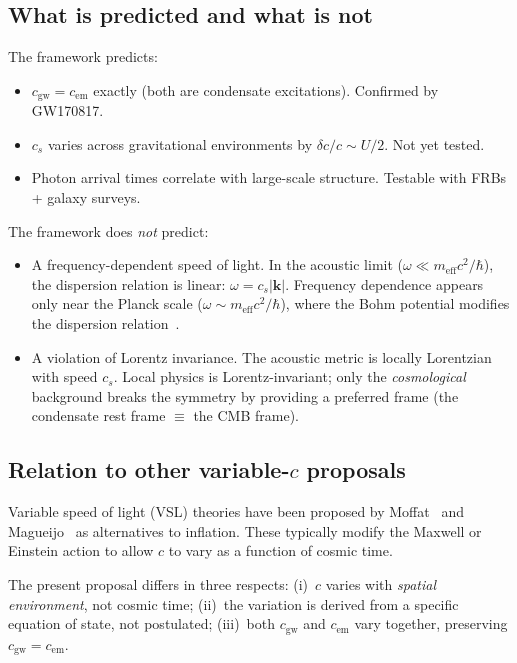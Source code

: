 \documentclass[12pt, a4paper]{article}
\newcommand{\meff}{m_{\mathrm{eff}}}
\begin{document}
\subsection{What is predicted and what is not}

The framework predicts:
\begin{itemize}
\item $c_{\mathrm{gw}} = c_{\mathrm{em}}$ exactly
  (both are condensate excitations). Confirmed by
  GW170817.
\item $c_s$ varies across gravitational environments
  by $\delta c/c \sim U/2$. Not yet tested.
\item Photon arrival times correlate with large-scale
  structure. Testable with FRBs + galaxy surveys.
\end{itemize}

The framework does \emph{not} predict:
\begin{itemize}
\item A frequency-dependent speed of light. In the
  acoustic limit ($\omega \ll \meff c^2/\hbar$), the
  dispersion relation is linear:
  $\omega = c_s |\mathbf{k}|$. Frequency dependence
  appears only near the Planck scale
  ($\omega \sim \meff c^2/\hbar$), where the Bohm
  potential modifies the dispersion
  relation~\cite{amelino_2013}.
\item A violation of Lorentz invariance. The acoustic
  metric is locally Lorentzian with speed $c_s$. Local
  physics is Lorentz-invariant; only the
  \emph{cosmological} background breaks the symmetry
  by providing a preferred frame (the condensate rest
  frame $\equiv$ the CMB frame).
\end{itemize}

\subsection{Relation to other variable-\texorpdfstring{$c$}{c} proposals}

Variable speed of light (VSL) theories have been
proposed by Moffat~\cite{moffat_1993} and
Magueijo~\cite{magueijo_2003} as alternatives to
inflation. These typically modify the Maxwell or
Einstein action to allow $c$ to vary as a function
of cosmic time.

The present proposal differs in three respects:
(i)~$c$ varies with \emph{spatial environment}, not
cosmic time; (ii)~the variation is derived from a
specific equation of state, not postulated;
(iii)~both $c_{\mathrm{gw}}$ and
$c_{\mathrm{em}}$ vary together, preserving
$c_{\mathrm{gw}} = c_{\mathrm{em}}$.
\end{document}
